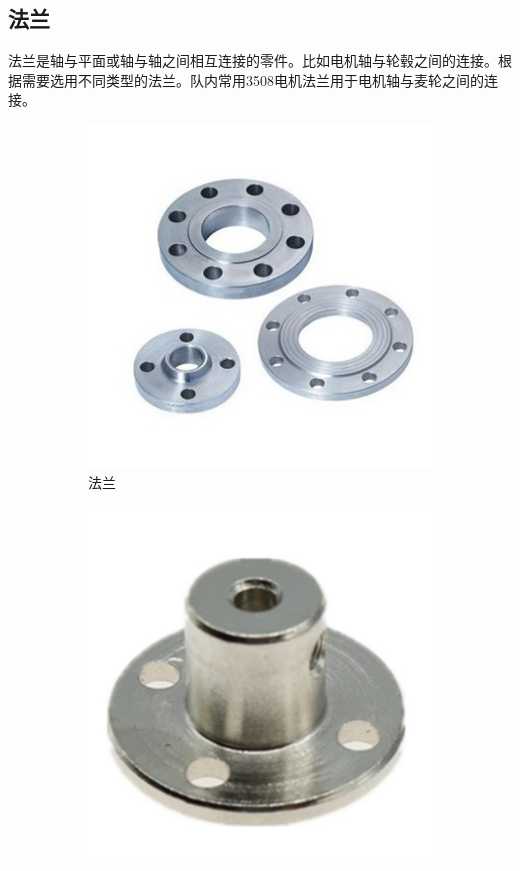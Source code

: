 \documentclass[UTF8]{article} %
\begin{document}
\subsection{法兰}
法兰是轴与平面或轴与轴之间相互连接的零件。比如电机轴与轮毂之间的连接。根据需要选用不同类型的法兰。队内常用3508电机法兰用于电机轴与麦轮之间的连接。
\begin{figure}[H]
  \centering
  \begin{subfigure}[b]{0.2\textwidth}
         \centering
         \includegraphics[width=\textwidth]{fa1.png}
          \caption{法兰}
  \end{subfigure}
  \quad
  \begin{subfigure}[b]{0.2\textwidth}
          \centering
          \includegraphics[width=\textwidth]{fa2.png}

\end{subfigure}
\end{figure}
\end{document}
